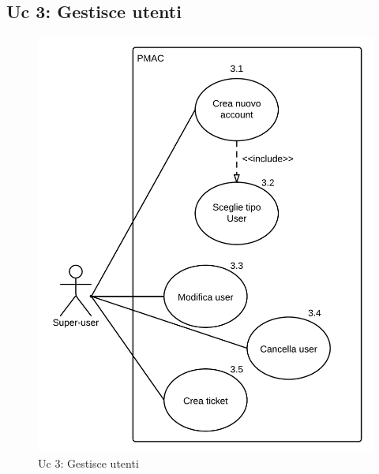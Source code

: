 \documentclass[10pt,a4paper]{article}
\begin{document}
\subsection{Uc 3: Gestisce utenti}
\begin{figure}[ht]
\centering
\caption{Uc 3: Gestisce utenti}
\includegraphics[scale=0.9]{UseCase/Uc3} %
\end{figure}
\end{document}
